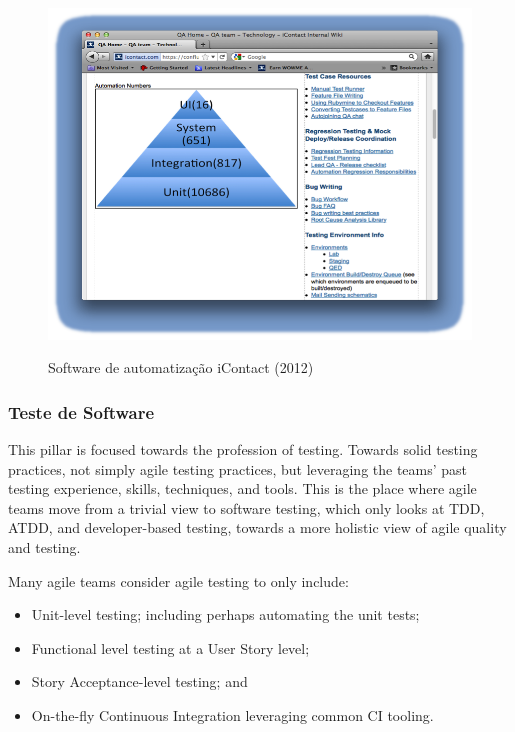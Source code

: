 \documentclass[
	12pt,				%
	openright,			%
	oneside,			%
	a4paper,			%
	english,			%
	brazil,				%
	]{abntex2}
\begin{document}
\begin{figure}[H]
    \centering
    \caption{Software de automatização iContact (2012)}
    \graphicspath{ {./graphics/agile/} }
    \includegraphics[scale=1.0]{icontact-automation-pyramid}
    \label{fig:icontact-automation-pyramid}
\end{figure}

\subsubsection{Teste de Software}
This pillar is focused towards the profession of testing. Towards solid testing practices, not simply agile testing practices, but leveraging the teams' past testing experience, skills, techniques, and tools. This is the place where agile teams move from a trivial view to software testing, which only looks at TDD, ATDD, and developer-based testing, towards a more holistic view of agile quality and testing.

Many agile teams consider agile testing to only include:
\begin{itemize}
    \item Unit-level testing; including perhaps automating the unit tests;
    \item Functional level testing at a User Story level;
    \item Story Acceptance-level testing; and
    \item On-the-fly Continuous Integration leveraging common CI tooling.
\end{itemize}
\end{document}

